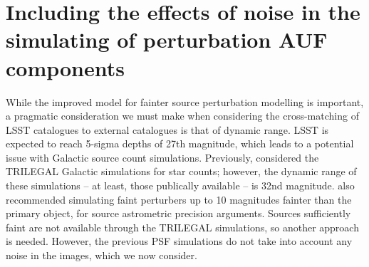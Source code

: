 \documentclass[fleqn,usenatbib]{mnras}
\begin{document}
\section{Including the effects of noise in the simulating of perturbation AUF components}
While the improved model for fainter source perturbation modelling is important, a pragmatic consideration we must make when considering the cross-matching of LSST catalogues to external catalogues is that of dynamic range. LSST is expected to reach 5-sigma depths of 27th magnitude, which leads to a potential issue with Galactic source count simulations. Previously, \citet{2018MNRAS.481.2148W} considered the TRILEGAL \citep{Girardi2005} Galactic simulations for star counts; however, the dynamic range of these simulations -- at least, those publically available -- is 32nd magnitude. \citet{2018MNRAS.481.2148W} also recommended simulating faint perturbers up to 10 magnitudes fainter than the primary object, for source astrometric precision arguments. Sources sufficiently faint are not available through the TRILEGAL simulations, so another approach is needed. However, the previous PSF simulations do not take into account any noise in the images, which we now consider.
\end{document}

